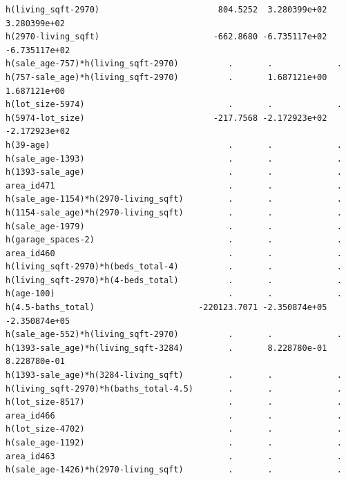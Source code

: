 \documentclass[
]{article}
\begin{document}
\begin{verbatim}
h(living_sqft-2970)                        804.5252  3.280399e+02  3.280399e+02
h(2970-living_sqft)                       -662.8680 -6.735117e+02 -6.735117e+02
h(sale_age-757)*h(living_sqft-2970)          .       .             .           
h(757-sale_age)*h(living_sqft-2970)          .       1.687121e+00  1.687121e+00
h(lot_size-5974)                             .       .             .           
h(5974-lot_size)                          -217.7568 -2.172923e+02 -2.172923e+02
h(39-age)                                    .       .             .           
h(sale_age-1393)                             .       .             .           
h(1393-sale_age)                             .       .             .           
area_id471                                   .       .             .           
h(sale_age-1154)*h(2970-living_sqft)         .       .             .           
h(1154-sale_age)*h(2970-living_sqft)         .       .             .           
h(sale_age-1979)                             .       .             .           
h(garage_spaces-2)                           .       .             .           
area_id460                                   .       .             .           
h(living_sqft-2970)*h(beds_total-4)          .       .             .           
h(living_sqft-2970)*h(4-beds_total)          .       .             .           
h(age-100)                                   .       .             .           
h(4.5-baths_total)                     -220123.7071 -2.350874e+05 -2.350874e+05
h(sale_age-552)*h(living_sqft-2970)          .       .             .           
h(1393-sale_age)*h(living_sqft-3284)         .       8.228780e-01  8.228780e-01
h(1393-sale_age)*h(3284-living_sqft)         .       .             .           
h(living_sqft-2970)*h(baths_total-4.5)       .       .             .           
h(lot_size-8517)                             .       .             .           
area_id466                                   .       .             .           
h(lot_size-4702)                             .       .             .           
h(sale_age-1192)                             .       .             .           
area_id463                                   .       .             .           
h(sale_age-1426)*h(2970-living_sqft)         .       .             .           
                                                                  

\end{verbatim}
\end{document}
